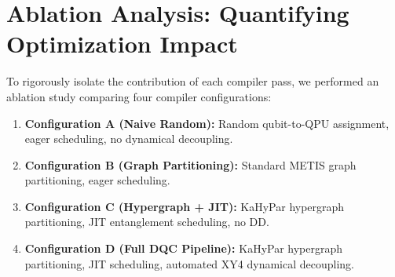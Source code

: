 \section{Ablation Analysis: Quantifying Optimization Impact}
\label{sec:ablation_analysis}

To rigorously isolate the contribution of each compiler pass, we performed an ablation study comparing four compiler configurations:
\begin{enumerate}
    \item \textbf{Configuration A (Naive Random):} Random qubit-to-QPU assignment, eager scheduling, no dynamical decoupling.
    \item \textbf{Configuration B (Graph Partitioning):} Standard METIS graph partitioning, eager scheduling.
    \item \textbf{Configuration C (Hypergraph + JIT):} KaHyPar hypergraph partitioning, JIT entanglement scheduling, no DD.
    \item \textbf{Configuration D (Full DQC Pipeline):} KaHyPar hypergraph partitioning, JIT scheduling, automated XY4 dynamical decoupling.
\end{enumerate}

